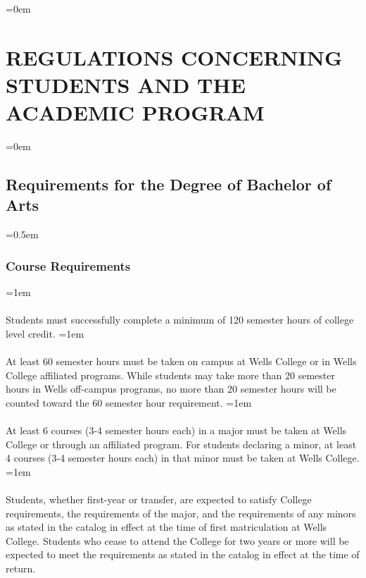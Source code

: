 \documentclass{manual}
\newcommand{\modified}[1]{}
\let\stdsection\section %
\renewcommand\section{\newpage\stdsection}
\let\oldsection\section
\renewcommand\section{\leftskip=0em\oldsection}
\let\oldsubsection\subsection
\renewcommand\subsection{\leftskip=0em\oldsubsection}
\let\oldsubsubsection\subsubsection
\renewcommand\subsubsection{\leftskip=0.5em\oldsubsubsection}
\let\oldparagraph\paragraph
\renewcommand\paragraph{\leftskip=1em\oldparagraph}
\begin{document}
\section{REGULATIONS CONCERNING STUDENTS AND THE ACADEMIC PROGRAM}\label{art:RegulationsConcerningStudentStatus}

\subsection{Requirements for the Degree of Bachelor of Arts}

\subsubsection{Course Requirements}

\paragraph{} Students must successfully complete a minimum of 120 semester\modified{5/13/93} hours of college level credit.
\paragraph{} At least 60 semester hours must be taken on campus at Wells College\modified{5/13/93} or in Wells College affiliated programs. While students may take more than 20 semester hours in Wells off-campus programs, no more than 20 semester hours will be counted toward the 60 semester hour requirement.
\paragraph{} At least 6 courses (3-4 semester hours each) in a major must be taken at Wells College or through an affiliated program. For students declaring a minor, at least 4 courses (3-4 semester hours each) in that minor must be taken at Wells College.
\paragraph{} Students, whether first-year or transfer, are expected to satisfy College requirements, the requirements of the major, and the requirements \modified{4/8/97} of any minors as stated in the catalog in effect at the time of first matriculation at Wells College. Students who cease to attend the College for two years or more will be expected to meet the requirements as stated in the catalog in effect at the time of return.
\end{document}

